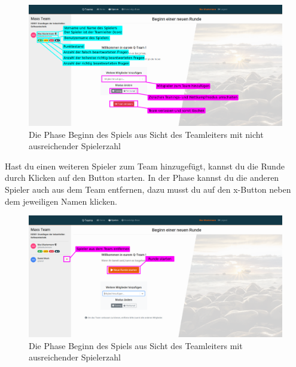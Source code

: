 \documentclass[a4paper,11pt,listof=numbered,glossary=totoc,parskip=half,toc=bib]{scrreprt}
\begin{document}
\begin{appendices}
	\begin{figure}[h!]
		\centering
		\includegraphics[width=\textwidth]{UserGuide/Rundenbeginn_Leiter.png}
		\caption{Die Phase Beginn des Spiels aus Sicht des Teamleiters mit nicht ausreichender Spielerzahl}
		\label{fig:guide_beginn_nichtbereit}
	\end{figure}
	
	Hast du einen weiteren Spieler zum Team hinzugefügt, kannst du die Runde durch Klicken auf den Button starten. In der Phase kannst du die anderen Spieler auch aus dem Team entfernen, dazu musst du auf den x-Button neben dem jeweiligen Namen klicken.
	
	\begin{figure}[h!]
		\centering
		\includegraphics[width=\textwidth]{UserGuide/Rundenbeginn_Leiter_2.png}
		\caption{Die Phase Beginn des Spiels aus Sicht des Teamleiters mit ausreichender Spielerzahl}
		\label{fig:guide_beginn_bereit}
	\end{figure}
	

\end{appendices}
\end{document}
